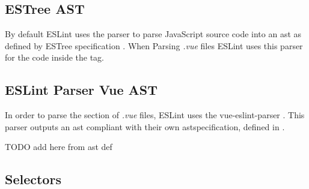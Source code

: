\subsection{ESTree AST}
By default ESLint uses the \parencite{eslintEspree} parser to parse JavaScript source code into an \gls{ast} as defined by ESTree specification \parencite{estreeASTSpec}. When Parsing \textit{.vue} files ESLint uses this parser for the code inside the  tag.
  
\subsection{ESLint Parser Vue AST}
In order to parse the  section of \textit{.vue} files, ESLint uses the vue-eslint-parser \parencite{eslint_vue_parser}. This parser outputs an  \gls{ast} compliant with their own  \gls{ast}specification, defined in \parencite{eslint_vue_parser_ast}.


TODO add here from ast def
\label{eslint:object_expression}

\label{eslint:property}

\label{eslint:velement}

\label{eslint:identifier}
\label{eslint:member_expression}
\label{eslint:call_expression}
\label{eslint:vtext}
\label{eslint:VAttribute}
\label{eslint:AssignmentExpression}


\subsection{Selectors}

